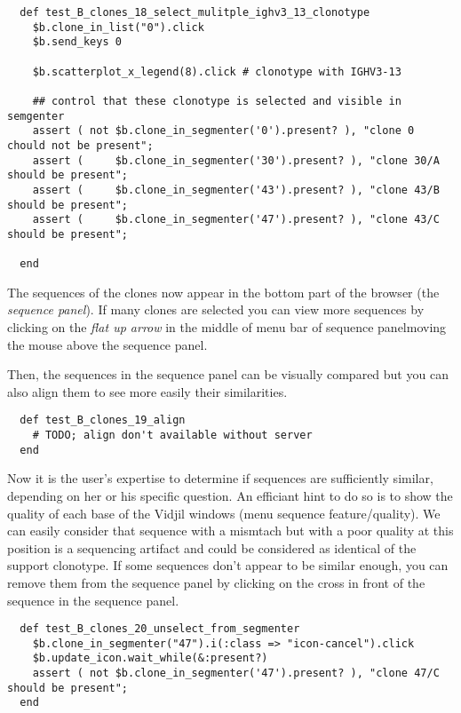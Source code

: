 \begin{verbatim}
  def test_B_clones_18_select_mulitple_ighv3_13_clonotype
    $b.clone_in_list("0").click
    $b.send_keys 0

    $b.scatterplot_x_legend(8).click # clonotype with IGHV3-13

    ## control that these clonotype is selected and visible in semgenter
    assert ( not $b.clone_in_segmenter('0').present? ), "clone 0 chould not be present";
    assert (     $b.clone_in_segmenter('30').present? ), "clone 30/A should be present";
    assert (     $b.clone_in_segmenter('43').present? ), "clone 43/B should be present";
    assert (     $b.clone_in_segmenter('47').present? ), "clone 43/C should be present";

  end
\end{verbatim}

The sequences of the clones now appear in the bottom part of the browser (the
\textit{sequence panel}). If many clones are selected you can view more sequences
by clicking on the \textit{flat up arrow} in the middle of menu bar of sequence panelmoving the mouse above the sequence panel.
 
Then, the sequences in the sequence panel can be visually compared but you can also align
them to see more easily their similarities.


\begin{verbatim}
  def test_B_clones_19_align
    # TODO; align don't available without server
  end
\end{verbatim}

Now it is the user's expertise to determine if sequences are sufficiently
similar, depending on her or his specific question. 
An efficiant hint to do so is to show the quality of each base of the Vidjil windows (menu sequence feature/quality). 
We can easily consider that sequence with a mismtach but with a poor quality at this position is a sequencing artifact and could be considered as identical of the support clonotype.
If some sequences don't appear to be similar enough, you can remove
them from the sequence panel by clicking on the cross in front of the sequence in
the sequence panel.
\begin{verbatim}
  def test_B_clones_20_unselect_from_segmenter
    $b.clone_in_segmenter("47").i(:class => "icon-cancel").click
    $b.update_icon.wait_while(&:present?)
    assert ( not $b.clone_in_segmenter('47').present? ), "clone 47/C should be present";
  end
\end{verbatim}

